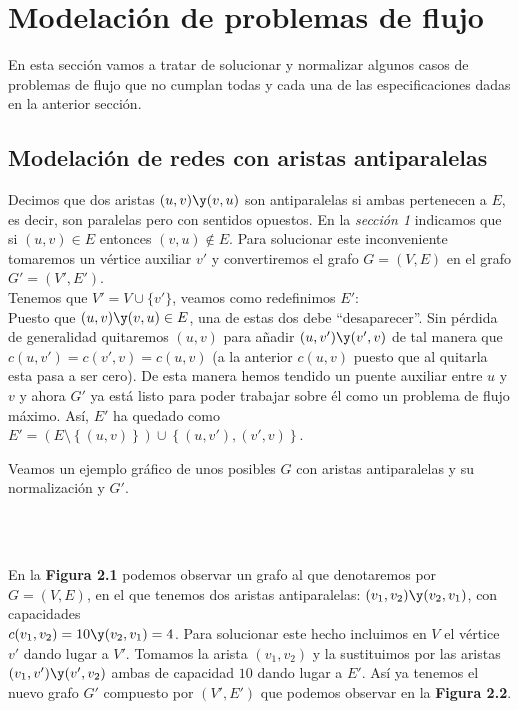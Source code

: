 \section{Modelación de problemas de flujo}

En esta sección vamos a tratar de solucionar y normalizar algunos casos de problemas de flujo que no cumplan todas y cada una de las especificaciones dadas en la anterior sección.
\subsection{Modelación de redes con aristas antiparalelas}

Decimos que dos aristas $(u,v)\y (v,u)$ son antiparalelas si ambas pertenecen a $E$, es decir, son paralelas pero con sentidos opuestos. En la \textit{sección 1} indicamos que si $(u,v)\in E$ entonces $(v,u)\notin E$. Para solucionar este inconveniente tomaremos un vértice auxiliar $v'$ y convertiremos el grafo $G=(V,E)$ en el grafo $G'=(V',E')$.\\

Tenemos que $V'=V\cup \{v'\}$, veamos como redefinimos $E'$:\\
Puesto que $(u,v)\y (v,u)\in E$, una de estas dos debe ``desaparecer''. Sin pérdida de generalidad quitaremos $(u,v)$ para añadir $(u,v')\y(v',v)$ de tal manera que\\
$c(u,v')=c(v',v)=c(u,v)$ (a la anterior $c(u,v)$ puesto que al quitarla esta pasa a ser cero). De esta manera hemos tendido un puente auxiliar entre $u$ y $v$ y ahora $G'$ ya está listo para poder trabajar sobre él como un problema de flujo máximo. Así, $E'$ ha quedado como $E'=\left(E\setminus\left\{(u,v)\right\}\right)\cup\left\{(u,v'),(v',v)\right\}$.\\

\begin{ejem} Veamos un ejemplo gráfico de unos posibles $G$ con aristas antiparalelas y su normalización y $G'$.

\begin{figura}\ \begin{center}\end{center}\end{figura}
\ \\

En la \textbf{Figura 2.1} podemos observar un grafo al que denotaremos por $G=(V,E)$, en el que tenemos dos aristas antiparalelas: $(v_1,v_2)\y(v_2,v_1)$, con capacidades\\
$c(v_1,v_2)=10\y(v_2,v_1)=4$. Para solucionar este hecho incluimos en $V$ el vértice $v'$ dando lugar a $V'$. Tomamos la arista $(v_1,v_2)$ y la sustituimos por las aristas $(v_1,v')\y(v',v_2)$ ambas de capacidad $10$ dando lugar a $E'$.
Así ya tenemos el nuevo grafo $G'$ compuesto por $(V',E')$ que podemos observar en la \textbf{Figura 2.2}.

\begin{figura}\ \begin{center}\end{center}\end{figura}
\end{ejem}

